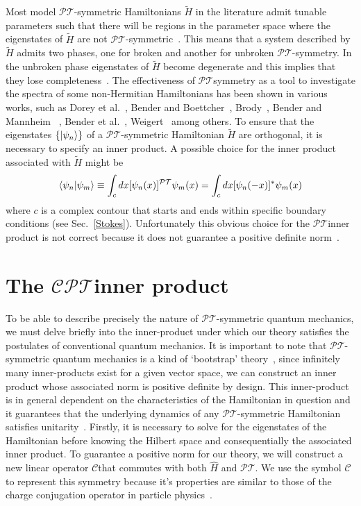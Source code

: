 \documentclass[12pt, a4paper]{report}
\newcommand\PT{\(\mathcal{PT}\)}
\newcommand\CC{\(\mathcal{C}\)}
\begin{document}
Most model \PT-symmetric Hamiltonians $\tilde{H}$ in the literature admit tunable parameters such that there will be regions in the parameter space where the eigenstates of $\tilde{H}$ are not \PT-symmetric~\cite{Brody_2013}. This means that a system described by $\tilde{H}$ admits two phases, one for broken and another for unbroken \PT-symmetry. In the unbroken phase eigenstates of $\tilde{H}$ become degenerate and this implies that they lose completeness~\cite{Brody_2013}.
The effectiveness of \PT\:symmetry as a tool to investigate the spectra of some non-Hermitian Hamiltonians has been shown in various works, such as Dorey et al.~\cite{Dorey_2001, Dorey_2004}, Bender and Boettcher~\cite{RealSpectrainNHH}, Brody~\cite{Brody_2016}, Bender and Mannheim ~\cite{Bender_2010}, Bender et al.~\cite{PTsymmetricQM}, Weigert~\cite{Weigert_2003} among others.
To ensure that the eigenstates $\{\ket{\psi_n}\}$ of a \PT-symmetric Hamiltonian $\tilde{H}$ are orthogonal, it is necessary to specify an inner product. A possible choice for the inner product associated with $\tilde{H}$ might be~\cite{PTsymmetricQM}
\begin{equation}\label{eq:2.3}
\braket{\psi_n|\psi_m} \equiv \int_{c} dx [\psi_{n}(x)]^{\mathcal{PT}}\psi_m(x) = \int_{c} dx [\psi_{n}(-x)]^{*}\psi_m(x)
\end{equation}
where $c$ is a complex contour that starts and ends within specific boundary conditions (see Sec.~\ref{Stokes}). Unfortunately this obvious choice for the \PT\:inner product is not correct because it does not guarantee a positive definite norm~\cite{MakingSense}.

\section{The \texorpdfstring{$\mathcal{CPT}$}\:\:inner product}\label{CPT}
To be able to describe precisely the nature of \PT-symmetric quantum mechanics, we must delve briefly into the inner-product under which our theory satisfies the postulates of conventional quantum mechanics. It is important to note that \PT-symmetric quantum mechanics is a kind of `bootstrap' theory~\cite{MakingSense}, since infinitely many inner-products exist for a given vector space, we can construct an inner product whose associated norm is positive definite by design. This inner-product is in general dependent on the characteristics of the Hamiltonian in question and it guarantees that the underlying dynamics of any \PT-symmetric Hamiltonian satisfies unitarity~\cite{MustaHbeHermitian}.
Firstly, it is necessary to solve for the eigenstates of the Hamiltonian before knowing the Hilbert space and consequentially the associated inner product.
To guarantee a positive norm for our theory, we will construct a new linear operator \CC\:that commutes with both $\hat{H}$ and \PT. We use the symbol \CC\: to represent this symmetry because it's properties are similar to those of the charge conjugation operator in particle physics~\cite{MakingSense}.
\end{document}
